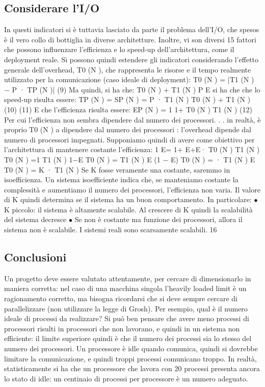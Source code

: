 \subsection{Considerare l'I/O}
In questi indicatori si è tuttavia lasciato da parte il problema dell'I/O, che
spesos è il vero collo di bottiglia in diverse architetture. Inoltre, vi son diversi
15
fattori che possono influenzare l'efficienza e lo speed-up dell'architettura, come
il deployment reale. Si possono quindi estendere gli indicatori considerando
l'effetto generale dell'overhead, T0 (N ), che rappresenta le risorse e il tempo
realmente utilizzato per la comunicazione (caso ideale di deployment):
T0 (N ) = |T1 (N ) $-$ P · TP (N )|
(9)
Ma quindi, si ha che:
T0 (N ) + T1 (N )
P
E si ha che che lo speed-up risulta essere:
TP (N ) =
SP (N ) =
P · T1 (N )
T0 (N ) + T1 (N )
(10)
(11)
E che l'efficienza risulta essere:
EP (N ) =
1
1+
T0 (N )
T1 (N )
(12)
Per cui l'efficienza non sembra dipendere dal numero dei processori. . . in realtà,
è proprio T0 (N ) a dipendere dal numero dei processori : l'overhead dipende dal
numero di processori impegnati.
Supponiamo quindi di avere come obiettivo per l'architettura di mantenere
costante l'efficienza:
1
E=
1+
E+E·
T0 (N )
T1 (N )
T0 (N )
=1
T1 (N )
1$-$E
T0 (N )
=
T1 (N )
E
(1 $-$ E)
T0 (N ) =
· T1 (N )
E
T0 (N ) = K · T1 (N )
Se K fosse veramente una costante, saremmo in isoefficienza. Un sistema isoefficiente indica che, se manteniamo costante
la
complessità e aumentiamo il
numero dei processori, l'efficienza non varia. Il valore di K quindi determina se
il sistema ha un buon comportamento. In particolare:
$\bullet$ K piccolo: il sistema è altamente scalabile. Al crescere di K quindi la
scalabilità del sistema decresce
$\bullet$ Se non è costante ma funzione dei processori, allora il sistema non è
scalabile.
I sistemi reali sono scarsamente scalabili.
16
\subsection{Conclusioni}
Un progetto deve essere valutato attentamente, per cercare di dimensionarlo in maniera corretta: nel caso di una
macchina singola l'heavily loaded limit è un ragionamento corretto, ma bisogna ricordarsi che si deve sempre cercare di
parallelizzare (non utilizzare la legge di Grosh). Per esempio, qual è il numero ideale di processi da realizzare? Si
può ben pensare che avere meno processi di processori risulti in processori che non lavorano, e quindi in un sistema 
non efficiente: il limite superiore quindi è che il numero dei processi sia lo stesso del numero dei processori. Un
processore è idle quando comunica, quindi si dovrebbe limitare la comunicazione, e quindi troppi processi comunicano
troppo.
In realtà, statisticamente si ha che un processore che lavora con 20 processi presenta ancora lo stato di idle: un
centinaio di processi per processore è un numero adeguato.
